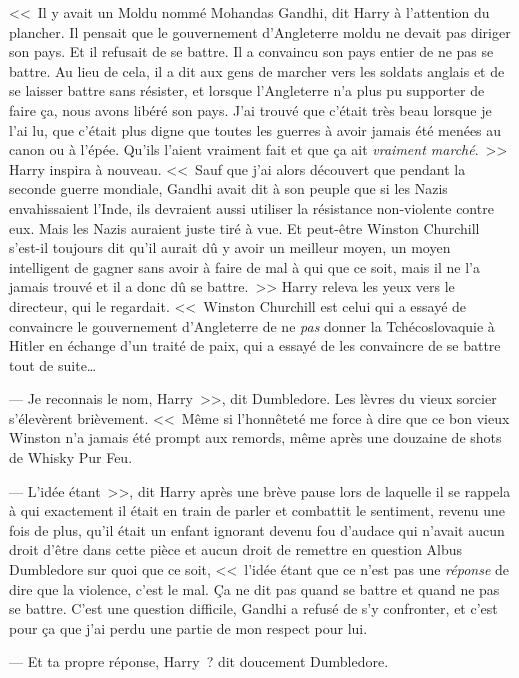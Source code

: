 <<~Il y avait un Moldu nommé Mohandas Gandhi, dit Harry à l'attention du plancher. Il pensait que le gouvernement d'Angleterre moldu ne devait pas diriger son pays. Et il refusait de se battre. Il a convaincu son pays entier de ne pas se battre. Au lieu de cela, il a dit aux gens de marcher vers les soldats anglais et de se laisser battre sans résister, et lorsque l'Angleterre n'a plus pu supporter de faire ça, nous avons libéré son pays. J'ai trouvé que c'était très beau lorsque je l'ai lu, que c'était plus digne que toutes les guerres à avoir jamais été menées au canon ou à l'épée. Qu'ils l'aient vraiment fait et que ça ait \emph{vraiment marché}.~>> Harry inspira à nouveau. <<~Sauf que j'ai alors découvert que pendant la seconde guerre mondiale, Gandhi avait dit à son peuple que si les Nazis envahissaient l'Inde, ils devraient aussi utiliser la résistance non-violente contre eux. Mais les Nazis auraient juste tiré à vue. Et peut-être Winston Churchill s'est-il toujours dit qu'il aurait dû y avoir un meilleur moyen, un moyen intelligent de gagner sans avoir à faire de mal à qui que ce soit, mais il ne l'a jamais trouvé et il a donc dû se battre.~>> Harry releva les yeux vers le directeur, qui le regardait. <<~Winston Churchill est celui qui a essayé de convaincre le gouvernement d'Angleterre de ne \emph{pas} donner la Tchécoslovaquie à Hitler en échange d'un traité de paix, qui a essayé de les convaincre de se battre tout de suite…

--- Je reconnais le nom, Harry~>>, dit Dumbledore. Les lèvres du vieux sorcier s'élevèrent brièvement. <<~Même si l'honnêteté me force à dire que ce bon vieux Winston n'a jamais été prompt aux remords, même après une douzaine de shots de Whisky Pur Feu.

--- L'idée étant~>>, dit Harry après une brève pause lors de laquelle il se rappela à qui exactement il était en train de parler et combattit le sentiment, revenu une fois de plus, qu'il était un enfant ignorant devenu fou d'audace qui n'avait aucun droit d'être dans cette pièce et aucun droit de remettre en question Albus Dumbledore sur quoi que ce soit, <<~l'idée étant que ce n'est pas une \emph{réponse} de dire que la violence, c'est le mal. Ça ne dit pas quand se battre et quand ne pas se battre. C'est une question difficile, Gandhi a refusé de s'y confronter, et c'est pour ça que j'ai perdu une partie de mon respect pour lui.

--- Et ta propre réponse, Harry~? dit doucement Dumbledore.

